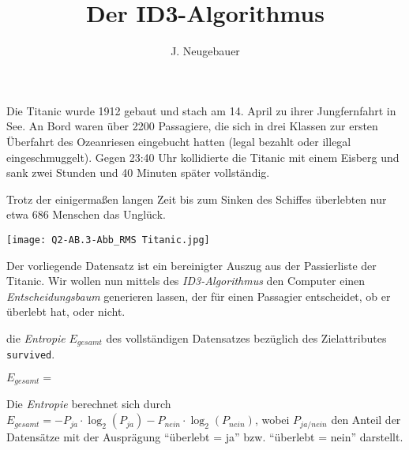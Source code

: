 \documentclass[10pt, a4paper]{scrartcl}
\author{J. Neugebauer}
\title{Der ID3-Algorithmus}
\date{\Heute}
\begin{document}
\ReiheTitel

\begin{rahmen}\small
	\begin{minipage}{0.69\textwidth}
		Die Titanic wurde 1912 gebaut und stach am 14. April zu ihrer Jungfernfahrt in See. An Bord waren über 2200 Passagiere, die sich in drei Klassen zur ersten Überfahrt des Ozeanriesen eingebucht hatten (legal bezahlt oder illegal eingeschmuggelt). Gegen 23:40 Uhr kollidierte die Titanic mit einem Eisberg und sank zwei Stunden und 40 Minuten später vollständig.
		
		Trotz der einigermaßen langen Zeit bis zum Sinken des Schiffes überlebten nur etwa 686 Menschen das Unglück.
	\end{minipage} \hfill
	\begin{minipage}{0.3\textwidth}
		\begin{center}
			\texttt{[image: Q2-AB.3-Abb\_RMS Titanic.jpg]}
		\end{center}
	\end{minipage}
\end{rahmen}
\bigskip

Der vorliegende Datensatz ist ein bereinigter Auszug aus der Passierliste der Titanic. Wir wollen nun mittels des \emph{ID3-Algorithmus} den Computer einen \emph{Entscheidungsbaum} generieren lassen, der für einen Passagier entscheidet, ob er überlebt hat, oder nicht.

\begin{aufgabe}
	 die \emph{Entropie} $E_{gesamt}$ des vollständigen Datensatzes bezüglich des Zielattributes 
	\texttt{survived}.
	
	\begin{center}
		$E_{gesamt} = $\linie[12cm]
	\end{center}
		
	\begin{infobox}
		Die \emph{Entropie} berechnet sich durch $E_{gesamt} = -P_{ja}\cdot \log_2{(P_{ja})} -P_{nein}\cdot \log_2{(P_{nein})}$, wobei $P_{ja/nein}$ den Anteil der Datensätze mit der Ausprägung \enquote{überlebt = ja} bzw. \enquote{überlebt = nein} darstellt.
	\end{infobox}
\end{aufgabe}
\end{document}
